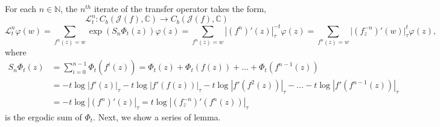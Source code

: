 \documentclass[12pt,reqno]{amsart}
\begin{document}
  \noindent  For each $n \in \mathbb{N}$, the $n^{th}$ iterate of the transfer operator takes the form,
    $$\mathcal{L}_t^n: C_b(\mathcal{J}(f),\mathbb{C}) \to C_b(\mathcal{J}(f),\mathbb{C})$$
\begin{equation}
    \mathcal{L}_t^n \varphi(w)=\sum_{f^n(z)=w}\exp(S_n\Phi_t(z))\varphi(z)=\sum_{f^n(z)=w}|(f^n)'(z)|_{\tau}^{-t}\varphi(z)=\sum_{f^n(z)=w}\big|(f_z^{-n})'(w)\big|_{\tau}^t\varphi(z),
\end{equation}
where 
\begin{align*}
    S_n\Phi_t(z) & =\sum_{i=0}^{n-1}\Phi_t(f^{i}(z))=\Phi_t(z)+\Phi_t(f(z))+...+\Phi_t(f^{n-1}(z))\\
    & = -t\log|f'(z)|_{\tau}-t\log|f'(f(z))|_{\tau}-t\log|f'(f^2(z))|_{\tau}-...-t\log|f'(f^{n-1}(z))|_{\tau}\\
    & = -t\log\left| (f^n)'(z) \right|_{\tau}=t\log\left| (f_z^{-n})'(f^n(z)) \right|_{\tau}
\end{align*}
is the ergodic sum of $\Phi_t$. Next, we show a series of lemma.
\end{document}

